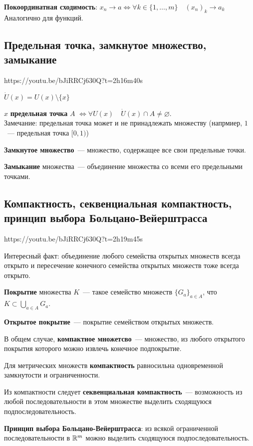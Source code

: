 \documentclass[../main.tex]{subfiles}
\begin{document}
\textbf{Покоординатная сходимость}:
$x_n\to a \Leftrightarrow \forall k \in \{1,\dots,m\} \quad (x_n)_k \to a_k$\\
Аналогично для функций.

\subsection{Предельная точка, замкнутое множество, замыкание}
https://youtu.be/bJiRRCj630Q?t=2h16m40s

$\dot{U}(x)=U(x)\setminus\{x\}$

$x$ \textbf{предельная точка} $A$ $\Leftrightarrow \forall U(x) \quad \dot{U}(x) \cap A \neq \varnothing$.\\
Замечание: предельная точка может и не принадлежать множеству
(напрмиер, $1$~--- предельная точка $[0,1)$) 

\textbf{Замкнутое множество}~--- множество, содержащее все свои предельные точки.

\textbf{Замыкание} множества~--- объединение множества со всеми его предельными точками.

\subsection{Компактность, секвенциальная компактность, принцип выбора Больцано-Вейерштрасса}
https://youtu.be/bJiRRCj630Q?t=2h19m45s

Интересный факт: объединение любого семейства открытых множеств всегда открыто
и пересечение конечного семейства открытых множеств тоже всегда открыто.

\textbf{Покрытие} множества $K$~--- такое семейство множеств $\{G_a\}_{a \in A}$,
что $K \subset \bigcup\limits_{a \in A}G_a$.

\textbf{Открытое покрытие}~--- покрытие семейством открытых множеств.

В общем случае, \textbf{компактное множетсво}~--- множество, из любого открытого покрытия которого
можно извлечь конечное подпокрытие.

Для метрических множеств \textbf{компактность} равносильна одновременной замкнутости и ограниченности.

Из компактности следует \textbf{секвенциальная компактность}~---
возможность из любой последовательности в этом множестве выделить сходящуюся подпоследовательность.

\textbf{Принцип выбора Больцано-Вейерштрасса}: из всякой ограниченной последовательности в $\mathbb{R}^m$
можно выделить сходящуюся подпоследовательность.
\end{document}
